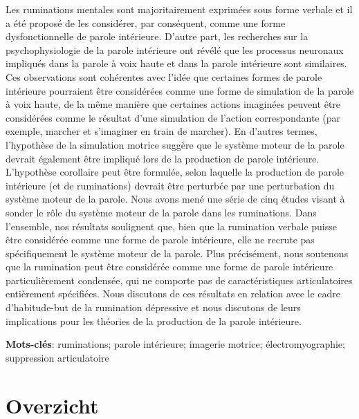\documentclass[a4paper,12pt,twoside,openright,oldfontcommands,final]{memoir}
\newcommand{\initial}[1]{
	\lettrine[lines=3,lhang=0.33,nindent=0em]{
		\color{gray}
     		{\textsc{#1}}}{}}
\newcommand{\clearemptydoublepage}{\newpage{\thispagestyle{empty}\cleardoublepage}}
\begin{document}
\initial{L}es ruminations mentales sont majoritairement exprimées sous forme verbale et il a été proposé de les considérer, par conséquent, comme une forme dysfonctionnelle de parole intérieure. D'autre part, les recherches sur la psychophysiologie de la parole intérieure ont révélé que les processus neuronaux impliqués dans la parole à voix haute et dans la parole intérieure sont similaires. Ces observations sont cohérentes avec l'idée que certaines formes de parole intérieure pourraient être considérées comme une forme de simulation de la parole à voix haute, de la même manière que certaines actions imaginées peuvent être considérées comme le résultat d'une simulation de l'action correspondante (par exemple, marcher et s'imaginer en train de marcher). En d'autres termes, l'hypothèse de la simulation motrice suggère que le système moteur de la parole devrait également être impliqué lors de la production de parole intérieure. L'hypothèse corollaire peut être formulée, selon laquelle la production de parole intérieure (et de ruminations) devrait être perturbée par une perturbation du système moteur de la parole. Nous avons mené une série de cinq études visant à sonder le rôle du système moteur de la parole dans les ruminations. Dans l'ensemble, nos résultats soulignent que, bien que la rumination verbale puisse être considérée comme une forme de parole intérieure, elle ne recrute pas spécifiquement le système moteur de la parole. Plus précisément, nous soutenons que la rumination peut être considérée comme une forme de parole intérieure particulièrement condensée, qui ne comporte pas de caractéristiques articulatoires entièrement spécifiées. Nous discutons de ces résultats en relation avec le cadre d'habitude-but de la rumination dépressive et nous discutons de leurs implications pour les théories de la production de la parole intérieure.

\vspace{\baselineskip}

\textbf{Mots-clés}: ruminations; parole intérieure; imagerie motrice; électromyographie; suppression articulatoire

\clearemptydoublepage

\chapter*{Overzicht}
\end{document}
